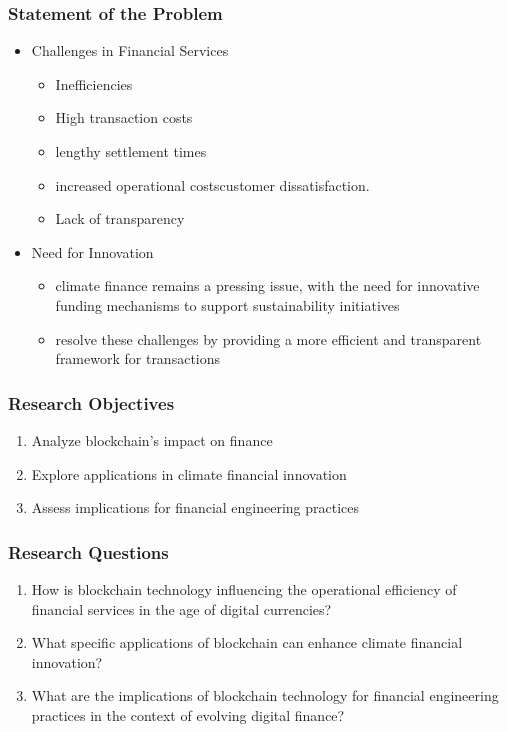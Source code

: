 \documentclass{beamer}
\begin{document}
\begin{frame}
    \frametitle{Statement of the Problem}
    \begin{itemize}
        \item Challenges in Financial Services
        \begin{itemize}
            \item Inefficiencies
            \item High transaction costs
            \item lengthy settlement times
            \item  increased operational costscustomer dissatisfaction.
            \item Lack of transparency
        \end{itemize}
        \item Need for Innovation
        \begin{itemize}
            \item climate finance remains a pressing issue, with the need for innovative funding mechanisms to support sustainability initiatives
            \item resolve these challenges by providing a more efficient and transparent framework for transactions
        \end{itemize}
    \end{itemize}
\end{frame}

\begin{frame} 
    \frametitle{Research Objectives}
\begin{enumerate}

    \item  Analyze blockchain's impact on finance
    \item Explore applications in climate financial innovation
    \item Assess implications for financial engineering practices
\end{enumerate}
\end{frame}
\begin{frame} 
    \frametitle{Research Questions}
\begin{enumerate}
    \item How is blockchain technology influencing the operational efficiency of financial services in the age of digital currencies?
   \item What specific applications of blockchain can enhance climate financial innovation?
   \item What are the implications of blockchain technology for financial engineering practices in the context of evolving digital finance?
  
\end{enumerate}
\end{frame}
\end{document}
